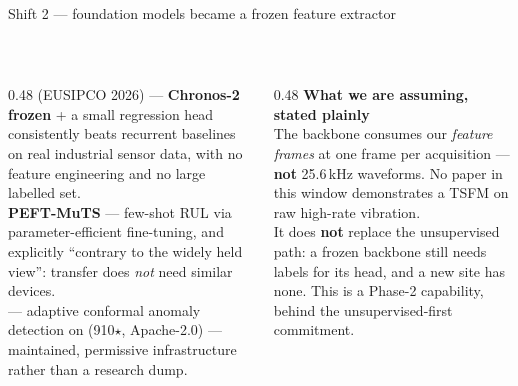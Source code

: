 \documentclass[aspectratio=169,10pt]{beamer}
\begin{document}
\begin{frame}{Shift 2 --- foundation models became a frozen feature extractor}
  \centering
  \\[3mm]
  \begin{columns}[T]
    \begin{column}{0.48\textwidth}
      \scriptsize
       (EUSIPCO 2026) --- \textbf{Chronos-2 frozen} + a small
      regression head consistently beats recurrent baselines on real industrial
      sensor data, with no feature engineering and no large labelled set.
      \\[1.5mm]
       \textbf{PEFT-MuTS} --- few-shot RUL via
      parameter-efficient fine-tuning, and explicitly ``contrary to the widely
      held view'': transfer does \emph{not} need similar devices.
      \\[1.5mm]
       --- adaptive conformal anomaly detection on
       (910$\star$, Apache-2.0) --- maintained,
      permissive infrastructure rather than a research dump.
    \end{column}
    \begin{column}{0.48\textwidth}
      \small\textbf{What we are assuming, stated plainly}
      \\[1.5mm]
      \scriptsize
      The backbone consumes our \emph{feature frames} at one frame per
      acquisition --- \textbf{not} 25.6\,kHz waveforms. No paper in this window
      demonstrates a TSFM on raw high-rate vibration.
      \\[2mm]
      It does \textbf{not} replace the unsupervised path: a frozen backbone
      still needs labels for its head, and a new site has none. This is a
      Phase-2 capability, behind the unsupervised-first commitment.
    \end{column}
  \end{columns}
\end{frame}
\end{document}
